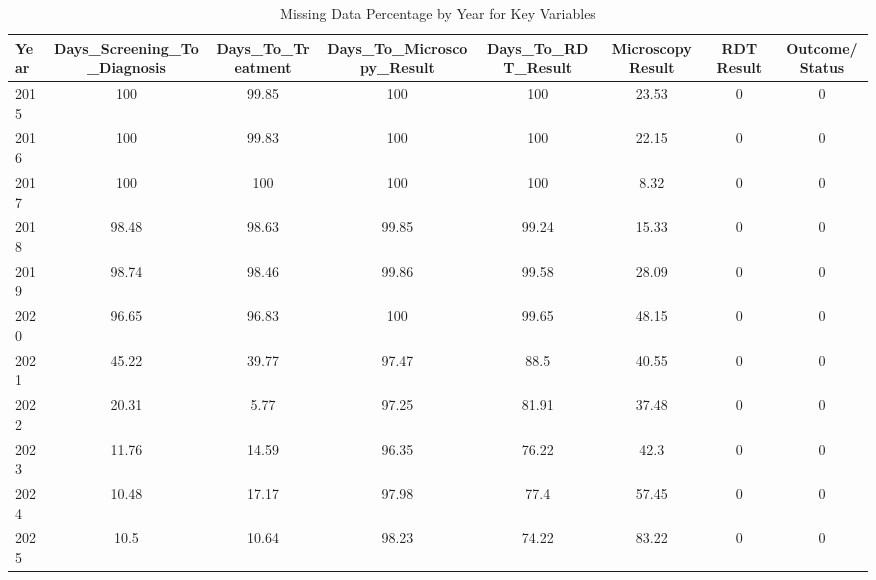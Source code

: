 \begin{table}[htbp]

\caption{Missing Data Percentage by Year for Key Variables}
\label{tab:missing_data_by_year}
\begin{tabular}{lccccccc}

\toprule

Year & Days\_Screening\_To\_Diagnosis & Days\_To\_Treatment & Days\_To\_Microscopy\_Result & Days\_To\_RDT\_Result & Microscopy Result & RDT Result & Outcome/Status \\

\midrule

2015 & 100 & 99.85 & 100 & 100 & 23.53 & 0 & 0 \\
2016 & 100 & 99.83 & 100 & 100 & 22.15 & 0 & 0 \\
2017 & 100 & 100 & 100 & 100 & 8.32 & 0 & 0 \\
2018 & 98.48 & 98.63 & 99.85 & 99.24 & 15.33 & 0 & 0 \\
2019 & 98.74 & 98.46 & 99.86 & 99.58 & 28.09 & 0 & 0 \\
2020 & 96.65 & 96.83 & 100 & 99.65 & 48.15 & 0 & 0 \\
2021 & 45.22 & 39.77 & 97.47 & 88.5 & 40.55 & 0 & 0 \\
2022 & 20.31 & 5.77 & 97.25 & 81.91 & 37.48 & 0 & 0 \\
2023 & 11.76 & 14.59 & 96.35 & 76.22 & 42.3 & 0 & 0 \\
2024 & 10.48 & 17.17 & 97.98 & 77.4 & 57.45 & 0 & 0 \\
2025 & 10.5 & 10.64 & 98.23 & 74.22 & 83.22 & 0 & 0 \\

\bottomrule

\end{tabular}

\end{table}